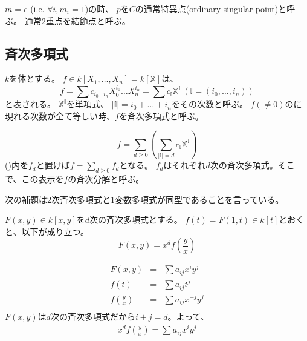 \documentclass[a4]{article}
\begin{document}
        \begin{Def}
            $m=e$ (i.e. $\forall i, m_i=1$)の時、
            $p$を$C$の通常特異点(ordinary singular point)と呼ぶ。
            通常2重点を結節点と呼ぶ。
        \end{Def}

        \subsection{斉次多項式}
        $k$を体とする。
        $f \in k[X_1, \dots, X_n]=k[\mathbb{X}]$は、
        \[
            f=\sum{c_{i_0 \dots i_n} X_0^{i_0} \dots X_n^{i_n}}
            =\sum{c_{\mathbb{I}} \mathbb{X}^{\mathbb{I}}} ~(\mathbb{I}=(i_0, \dots, i_n))
        \]
        と表される。
        $\mathbb{X}^{\mathbb{I}}$を単項式、
        $|\mathbb{I}|=i_0+\dots+i_n$をその次数と呼ぶ。
        $f(\neq 0)$のに現れる次数が全て等しい時、$f$を斉次多項式と呼ぶ。

        \[
            f=\sum_{d \geq 0}{ \left( \sum_{|\mathbb{I}|=d}{c_{\mathbb{I}} \mathbb{X}^{\mathbb{I}}} \right)}
        \]
        ()内を$f_d$と置けば$f=\sum_{d \geq 0}{f_d}$となる。
        $f_d$はそれぞれ$d$次の斉次多項式。そこで、この表示を$f$の斉次分解と呼ぶ。

        次の補題は2次斉次多項式と1変数多項式が同型であることを言っている。
        \begin{Lemma}
            $F(x, y) \in k[x,y]$を$d$次の斉次多項式とする。
            $f(t)=F(1, t) \in k[t]$とおくと、以下が成り立つ。
            \[ F(x, y)= x^d f(\frac{y}{x})\]
        \end{Lemma}
        \begin{Proof}
            \begin{eqnarray*}
                F(x, y) &=& \sum{a_{ij} x^{i} y^{j}} \\
                f(t)    &=& \sum{a_{ij} t^{j}} \\
                f\left( \frac{y}{x} \right)&=& \sum{a_{ij} x^{-j} y^{j}} \\
            \end{eqnarray*}
            $F(x, y)$は$d$次の斉次多項式だから$i+j=d$。よって、
            \begin{eqnarray*}
                x^d f\left( \frac{y}{x} \right)=\sum{a_{ij} x^{i} y^{j}}
            \end{eqnarray*}
            \QED
        \end{Proof}
\end{document}
